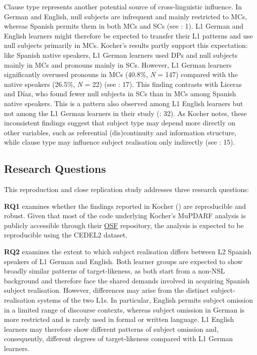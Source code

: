 \documentclass[
  letterpaper,
  DIV=11,
  numbers=noendperiod]{scrartcl}
\begin{document}
Clause type represents another potential source of cross-linguistic
influence. In German and English, null subjects are infrequent and
mainly restricted to MCs, whereas Spanish permits them in both MCs and
SCs (see : 1). L1 German and English learners might
therefore be expected to transfer their L1 patterns and use null
subjects primarily in MCs. Kocher's results partly support this
expectation: like Spanish native speakers, L1 German learners used DPs
and null subjects mainly in MCs and pronouns mainly in SCs. However, L1
German learners significantly overused pronouns in MCs (40.8\%, \emph{N}
= 147) compared with the native speakers (26.5\%, \emph{N} = 22) (see
: 17). This finding
contrasts with Liceras and Díaz, who found fewer null subjects in SCs
than in MCs among Spanish native speakers. This is a pattern also
observed among L1 English learners but not among the L1 German learners
in their study (: 32). As Kocher notes, these inconsistent findings suggest that
subject type may depend more directly on other variables, such as
referential (dis)continuity and information structure, while clause type
may influence subject realisation only indirectly (see
: 15).

\subsection{Research Questions}\label{research-questions}

This reproduction and close replication study addresses three research
questions:

\textbf{RQ1} examines whether the findings reported in Kocher
() are reproducible and robust.
Given that most of the code underlying Kocher's MuPDARF analysis is
publicly accessible through their
\href{https://osf.io/zr9wh/overview}{OSF} repository, the analysis is
expected to be reproducible using the CEDEL2 dataset.

\textbf{RQ2} examines the extent to which subject realisation differs
between L2 Spanish speakers of L1 German and English. Both learner
groups are expected to show broadly similar patterns of target-likeness,
as both start from a non-NSL background and therefore face the shared
demands involved in acquiring Spanish subject realisation. However,
differences may arise from the distinct subject-realisation systems of
the two L1s. In particular, English permits subject omission in a
limited range of discourse contexts, whereas subject omission in German
is more restricted and is rarely used in formal or written language. L1
English learners may therefore show different patterns of subject
omission and, consequently, different degrees of target-likeness
compared with L1 German learners.
\end{document}
